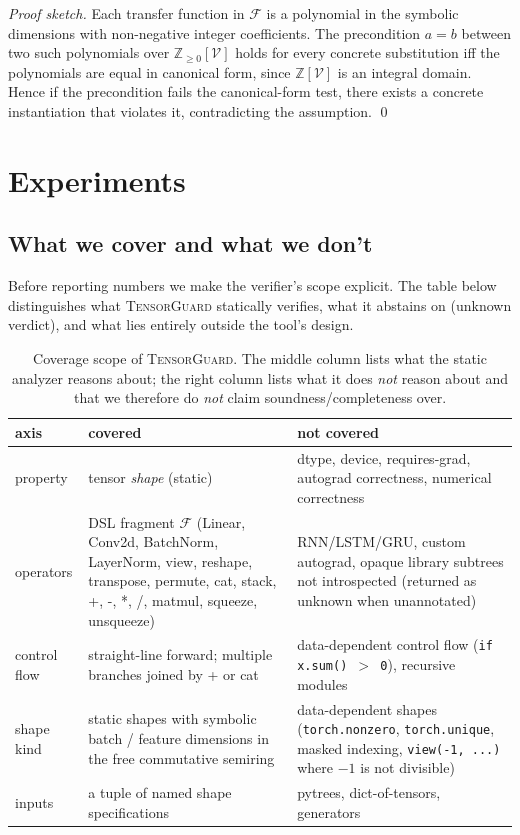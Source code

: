 \documentclass{article}
\theoremstyle{definition}
\begin{document}
\begin{proof}[Proof sketch]
Each transfer function in $\mathcal F$ is a polynomial in the
symbolic dimensions with non-negative integer coefficients. The
precondition $a=b$ between two such polynomials over
$\mathbb Z_{\ge 0}[\mathcal V]$ holds for every concrete substitution
iff the polynomials are equal in canonical form, since
$\mathbb Z[\mathcal V]$ is an integral domain. Hence if the
precondition fails the canonical-form test, there exists a concrete
instantiation that violates it, contradicting the assumption.
\qed
\end{proof}

\section{Experiments}\label{sec:experiments}

\subsection{What we cover and what we don't}\label{sec:cover}

Before reporting numbers we make the verifier's scope explicit. The
table below distinguishes what \textsc{TensorGuard} statically
verifies, what it abstains on (\textsf{unknown} verdict), and what
lies entirely outside the tool's design.

\begin{table}[t]
\centering\small
\caption{Coverage scope of \textsc{TensorGuard}. The middle column
lists what the static analyzer reasons about; the right column
lists what it does \emph{not} reason about and that we therefore do
\emph{not} claim soundness/completeness over.}
\label{tab:cover}
\begin{tabular}{lp{4.6cm}p{4.6cm}}
\toprule
 axis & covered & not covered \\
\midrule
 property & tensor \emph{shape} (static) &
  dtype, device, requires-grad, autograd correctness, numerical
  correctness \\
 operators & DSL fragment $\mathcal F$ (Linear, Conv2d,
  BatchNorm, LayerNorm, view, reshape, transpose, permute, cat,
  stack, +, -, *, /, matmul, squeeze, unsqueeze) &
  RNN/LSTM/GRU, custom autograd, opaque library subtrees not
  introspected (returned as \textsf{unknown} when unannotated) \\
 control flow & straight-line forward; multiple branches
  joined by + or cat & data-dependent control flow (\texttt{if
  x.sum() $>$ 0}), recursive modules \\
 shape kind & static shapes with symbolic batch / feature
  dimensions in the free commutative semiring &
  data-dependent shapes (\texttt{torch.nonzero},
  \texttt{torch.unique}, masked indexing,
  \texttt{view(-1, ...)} where $-1$ is not divisible) \\
 inputs & a tuple of named shape specifications &
  pytrees, dict-of-tensors, generators \\
\bottomrule
\end{tabular}
\end{table}
\end{document}
